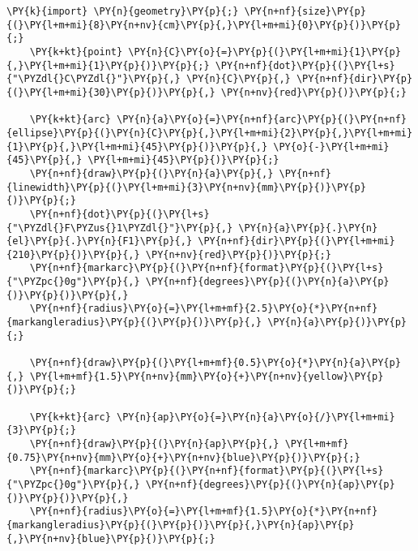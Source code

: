 \begin{Verbatim}[commandchars=\\\{\}]
    \PY{k}{import} \PY{n}{geometry}\PY{p}{;} \PY{n+nf}{size}\PY{p}{(}\PY{l+m+mi}{8}\PY{n+nv}{cm}\PY{p}{,}\PY{l+m+mi}{0}\PY{p}{)}\PY{p}{;}
    \PY{k+kt}{point} \PY{n}{C}\PY{o}{=}\PY{p}{(}\PY{l+m+mi}{1}\PY{p}{,}\PY{l+m+mi}{1}\PY{p}{)}\PY{p}{;} \PY{n+nf}{dot}\PY{p}{(}\PY{l+s}{"\PYZdl{}C\PYZdl{}"}\PY{p}{,} \PY{n}{C}\PY{p}{,} \PY{n+nf}{dir}\PY{p}{(}\PY{l+m+mi}{30}\PY{p}{)}\PY{p}{,} \PY{n+nv}{red}\PY{p}{)}\PY{p}{;}

    \PY{k+kt}{arc} \PY{n}{a}\PY{o}{=}\PY{n+nf}{arc}\PY{p}{(}\PY{n+nf}{ellipse}\PY{p}{(}\PY{n}{C}\PY{p}{,}\PY{l+m+mi}{2}\PY{p}{,}\PY{l+m+mi}{1}\PY{p}{,}\PY{l+m+mi}{45}\PY{p}{)}\PY{p}{,} \PY{o}{-}\PY{l+m+mi}{45}\PY{p}{,} \PY{l+m+mi}{45}\PY{p}{)}\PY{p}{;}
    \PY{n+nf}{draw}\PY{p}{(}\PY{n}{a}\PY{p}{,} \PY{n+nf}{linewidth}\PY{p}{(}\PY{l+m+mi}{3}\PY{n+nv}{mm}\PY{p}{)}\PY{p}{)}\PY{p}{;}
    \PY{n+nf}{dot}\PY{p}{(}\PY{l+s}{"\PYZdl{}F\PYZus{}1\PYZdl{}"}\PY{p}{,} \PY{n}{a}\PY{p}{.}\PY{n}{el}\PY{p}{.}\PY{n}{F1}\PY{p}{,} \PY{n+nf}{dir}\PY{p}{(}\PY{l+m+mi}{210}\PY{p}{)}\PY{p}{,} \PY{n+nv}{red}\PY{p}{)}\PY{p}{;}
    \PY{n+nf}{markarc}\PY{p}{(}\PY{n+nf}{format}\PY{p}{(}\PY{l+s}{"\PYZpc{}0g"}\PY{p}{,} \PY{n+nf}{degrees}\PY{p}{(}\PY{n}{a}\PY{p}{)}\PY{p}{)}\PY{p}{,}
    \PY{n+nf}{radius}\PY{o}{=}\PY{l+m+mf}{2.5}\PY{o}{*}\PY{n+nf}{markangleradius}\PY{p}{(}\PY{p}{)}\PY{p}{,} \PY{n}{a}\PY{p}{)}\PY{p}{;}

    \PY{n+nf}{draw}\PY{p}{(}\PY{l+m+mf}{0.5}\PY{o}{*}\PY{n}{a}\PY{p}{,} \PY{l+m+mf}{1.5}\PY{n+nv}{mm}\PY{o}{+}\PY{n+nv}{yellow}\PY{p}{)}\PY{p}{;}

    \PY{k+kt}{arc} \PY{n}{ap}\PY{o}{=}\PY{n}{a}\PY{o}{/}\PY{l+m+mi}{3}\PY{p}{;}
    \PY{n+nf}{draw}\PY{p}{(}\PY{n}{ap}\PY{p}{,} \PY{l+m+mf}{0.75}\PY{n+nv}{mm}\PY{o}{+}\PY{n+nv}{blue}\PY{p}{)}\PY{p}{;}
    \PY{n+nf}{markarc}\PY{p}{(}\PY{n+nf}{format}\PY{p}{(}\PY{l+s}{"\PYZpc{}0g"}\PY{p}{,} \PY{n+nf}{degrees}\PY{p}{(}\PY{n}{ap}\PY{p}{)}\PY{p}{)}\PY{p}{,}
    \PY{n+nf}{radius}\PY{o}{=}\PY{l+m+mf}{1.5}\PY{o}{*}\PY{n+nf}{markangleradius}\PY{p}{(}\PY{p}{)}\PY{p}{,}\PY{n}{ap}\PY{p}{,}\PY{n+nv}{blue}\PY{p}{)}\PY{p}{;}
\end{Verbatim}
